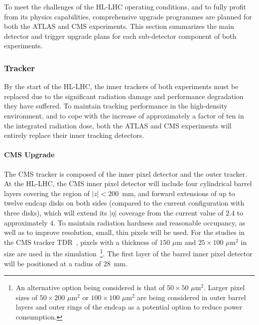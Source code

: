 To meet the challenges of the HL-LHC operating conditions, and to fully profit from its physics capabilities, comprehensive upgrade programmes are planned for both the ATLAS and CMS experiments. This section summarizes the main detector and trigger upgrade plans for each sub-detector component of both experiments.

\subsubsection{Tracker} \label{sec:upgradetracker}


By the start of the HL-LHC, the inner trackers of both experiments must be replaced due to the significant radiation damage and performance degradation they have suffered. To maintain tracking performance in the high-density environment, and to cope with the increase of approximately a factor of ten in the integrated radiation dose, both the ATLAS and CMS experiments will entirely replace their inner tracking detectors.

\paragraph{CMS Upgrade}
The CMS tracker is composed of the inner pixel detector and the outer tracker. At the HL-LHC, the CMS inner pixel detector will include four cylindrical barrel layers covering the region of $|z| < 200$~mm, and forward extensions of up to twelve endcap disks on both sides (compared to the current configuration with three disks), which will extend its $|\eta|$ coverage from the current value of $2.4$ to approximately $4$. To maintain radiation hardness and reasonable occupancy, as well as to improve resolution, small, thin pixels will be used. For the studies in the CMS tracker TDR~\cite{Collaboration:2272264}, pixels with a thickness of $150\,\, \mu \mathrm{m}$ and $25\times100\,\,{\mu \mathrm{m}}^2$ in size are used in the simulation~\footnote{An alternative option being considered is that of $50\times50\,\,{\mu \mathrm{m}}^2$. Larger pixel sizes of $50\times200\,\,{\mu \mathrm{m}}^2$ or $100\times100\,\,{\mu \mathrm{m}}^2$ are being considered in outer barrel layers and outer rings of the endcap as a potential option to reduce power consumption.}. The first layer of the barrel inner pixel detector will be positioned at a radius of 28~mm.

